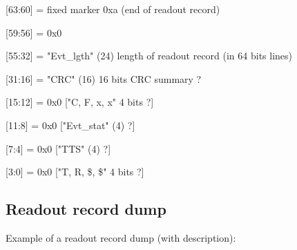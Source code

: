 [63:60] = fixed marker 0xa (end of readout record)

[59:56] = 0x0

[55:32] = "Evt\_lgth" (24) length of readout record (in 64 bits lines)

[31:16] = "CRC" (16) 16 bits CRC summary ?

[15:12] = 0x0 ["C, F, x, x" 4 bits ?]

[11:8] = 0x0 ["Evt\_stat" (4) ?]

[7:4] = 0x0 ["TTS" (4) ?]

[3:0] = 0x0 ["T, R, \$, \$" 4 bits ?]

\clearpage

\subsection{Readout record dump}
\label{sec:ror_dump}
Example of a readout record dump (with description):

